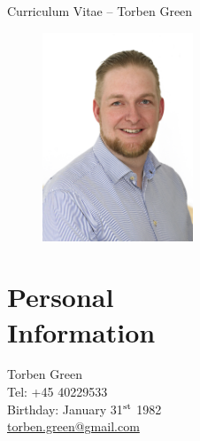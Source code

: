 \documentclass[margin,line,a4paper]{resume}
\begin{document}
{\sc \Large Curriculum Vitae -- Torben Green}
\begin{resume}
    \vspace{0.5cm}
    \begin{figure}
      \vspace{-1cm}
      \begin{center}
        \includegraphics[width=0.4\textwidth]{TOG_visitkort}
      \end{center}
      \vspace{-1cm}
    \end{figure}

    \section{\mysidestyle Personal\\Information}%
    Torben Green \\
    Tel: +45 40229533 \\
    Birthday: January 31$^{\rm st}$ 1982\\
    \href{mailto:torben.green@gmail.com}{torben.green@gmail.com} 


\end{resume}
\end{document}
